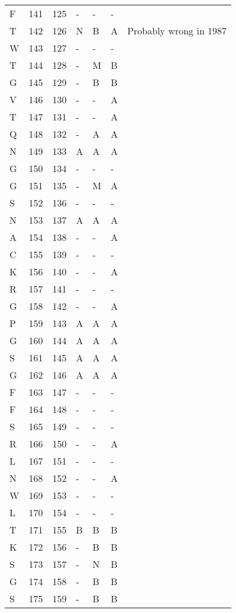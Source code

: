 \documentclass[10pt]{article}
\begin{document}
\begin{longtable}{lllllll}
  F & 141 & 125 & - & - & - &  \\ 
  T & 142 & 126 & N & B & A & Probably wrong in 1987 \\ 
  W & 143 & 127 & - & - & - &  \\ 
  T & 144 & 128 & - & M & B &  \\ 
  G & 145 & 129 & - & B & B &  \\ 
  V & 146 & 130 & - & - & A &  \\ 
  T & 147 & 131 & - & - & A &  \\ 
  Q & 148 & 132 & - & A & A &  \\ 
  N & 149 & 133 & A & A & A &  \\ 
  G & 150 & 134 & - & - & - &  \\ 
  G & 151 & 135 & - & M & A &  \\ 
  S & 152 & 136 & - & - & - &  \\ 
  N & 153 & 137 & A & A & A &  \\ 
  A & 154 & 138 & - & - & A &  \\ 
  C & 155 & 139 & - & - & - &  \\ 
  K & 156 & 140 & - & - & A &  \\ 
  R & 157 & 141 & - & - & - &  \\ 
  G & 158 & 142 & - & - & A &  \\ 
  P & 159 & 143 & A & A & A &  \\ 
  G & 160 & 144 & A & A & A &  \\ 
  S & 161 & 145 & A & A & A &  \\ 
  G & 162 & 146 & A & A & A &  \\ 
  F & 163 & 147 & - & - & - &  \\ 
  F & 164 & 148 & - & - & - &  \\ 
  S & 165 & 149 & - & - & - &  \\ 
  R & 166 & 150 & - & - & A &  \\ 
  L & 167 & 151 & - & - & - &  \\ 
  N & 168 & 152 & - & - & A &  \\ 
  W & 169 & 153 & - & - & - &  \\ 
  L & 170 & 154 & - & - & - &  \\ 
  T & 171 & 155 & B & B & B &  \\ 
  K & 172 & 156 & - & B & B &  \\ 
  S & 173 & 157 & - & N & B &  \\ 
  G & 174 & 158 & - & B & B &  \\ 
  S & 175 & 159 & - & B & B &  \\ 

\end{longtable}
\end{document}
